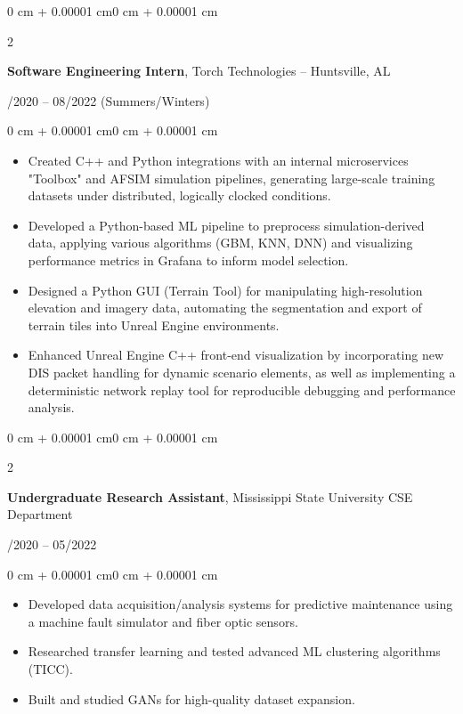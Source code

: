 \documentclass[11pt, letterpaper]{article}
\newenvironment{highlights}{
    \begin{itemize}[
        topsep=0.10 cm,
        parsep=0.10 cm,
        partopsep=0pt,
        itemsep=0pt,
        leftmargin=0.4 cm + 10pt
    ]
}{
    \end{itemize}
}
\newenvironment{onecolentry}{
    \begin{adjustwidth}{0 cm + 0.00001 cm}{0 cm + 0.00001 cm}
}{
    \end{adjustwidth}
}
\newenvironment{twocolentry}[1]{
    \onecolentry
    \def\secondColumn{#1}
    \setcolumnwidth{\fill,4.5cm}
    \begin{paracol}{2}
}{
    \switchcolumn \raggedleft \secondColumn
    \end{paracol}
    \endonecolentry
}
\begin{document}
\vspace{0.4cm}

\begin{twocolentry}{05/2020 – 08/2022 (Summers/Winters)}
    \textbf{Software Engineering Intern}, Torch Technologies -- Huntsville, AL
\end{twocolentry}

\vspace{0.10 cm}
\begin{onecolentry}
    \begin{highlights}
        \item Created C++ and Python integrations with an internal microservices "Toolbox" and AFSIM simulation pipelines, generating large-scale training datasets under distributed, logically clocked conditions.
        \item Developed a Python-based ML pipeline to preprocess simulation-derived data, applying various algorithms (GBM, KNN, DNN) and visualizing performance metrics in Grafana to inform model selection.
        \item Designed a Python GUI (Terrain Tool) for manipulating high-resolution elevation and imagery data, automating the segmentation and export of terrain tiles into Unreal Engine environments.
        \item Enhanced Unreal Engine C++ front-end visualization by incorporating new DIS packet handling for dynamic scenario elements, as well as implementing a deterministic network replay tool for reproducible debugging and performance analysis.
    \end{highlights}
\end{onecolentry}

\vspace{0.4 cm}

\begin{twocolentry}{09/2020 – 05/2022}
    \textbf{Undergraduate Research Assistant}, Mississippi State University CSE Department
\end{twocolentry}

\vspace{0.10 cm}
\begin{onecolentry}
    \begin{highlights}
        \item Developed data acquisition/analysis systems for predictive maintenance using a machine fault simulator and fiber optic sensors.
        \item Researched transfer learning and tested advanced ML clustering algorithms (TICC).
        \item Built and studied GANs for high-quality dataset expansion.
    \end{highlights}
\end{onecolentry}
\end{document}
